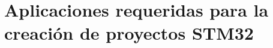\documentclass[
10pt, %
a4paper, %
oneside, %
headinclude,footinclude, %
BCOR5mm, %
]{scrartcl}
\begin{document}




\newpage %


\section{Aplicaciones requeridas para la creación de proyectos STM32}
\end{document}
